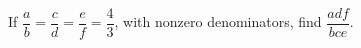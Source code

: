 If $\dfrac{a}{b}=\dfrac{c}{d}=\dfrac{e}{f}=\dfrac{4}{3}$, with nonzero denominators, find $\dfrac{adf}{bce}$.
